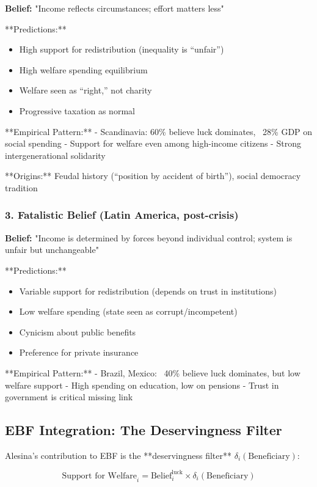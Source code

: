 \textbf{Belief:} "Income reflects circumstances; effort matters less"

**Predictions:**
\begin{itemize}
\item High support for redistribution (inequality is ``unfair'')
\item High welfare spending equilibrium
\item Welfare seen as ``right,'' not charity
\item Progressive taxation as normal
\end{itemize}

**Empirical Pattern:**
- Scandinavia: 60\% believe luck dominates, ~28\% GDP on social spending
- Support for welfare even among high-income citizens
- Strong intergenerational solidarity

**Origins:** Feudal history (``position by accident of birth''), social democracy tradition

\subsubsection{3. Fatalistic Belief (Latin America, post-crisis)}

\textbf{Belief:} "Income is determined by forces beyond individual control; system is unfair but unchangeable"

**Predictions:**
\begin{itemize}
\item Variable support for redistribution (depends on trust in institutions)
\item Low welfare spending (state seen as corrupt/incompetent)
\item Cynicism about public benefits
\item Preference for private insurance
\end{itemize}

**Empirical Pattern:**
- Brazil, Mexico: ~40\% believe luck dominates, but low welfare support
- High spending on education, low on pensions
- Trust in government is critical missing link

\subsection{EBF Integration: The Deservingness Filter}

Alesina's contribution to EBF is the **deservingness filter** $\delta_i(\text{Beneficiary})$:

\begin{equation}
\text{Support for Welfare}_i = \text{Belief}_i^{\text{luck}} \times \delta_i(\text{Beneficiary})
\end{equation}


